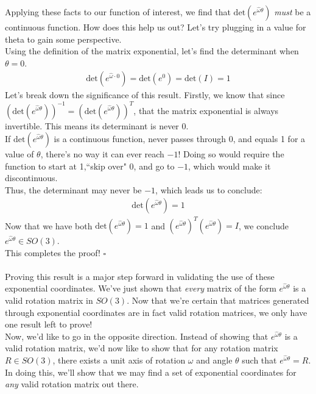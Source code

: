 \documentclass[oneside]{book}
\begin{document}
Applying these facts to our function of interest, we find that $\mathrm{det}(e^{\hat\omega\theta})$ \textit{must} be a continuous function. How does this help us out? Let's try plugging in a value for theta to gain some perspective.\\
Using the definition of the matrix exponential, let's find the determinant when $\theta = 0$.
\begin{align}
    \mathrm{det}(e^{\hat\omega\cdot 0}) = \mathrm{det}(e^{0}) = \mathrm{det}(I) = 1
\end{align}
Let's break down the significance of this result. Firstly, we know that since $(\mathrm{det}(e^{\hat\omega\theta}))^{-1} = (\mathrm{det}(e^{\hat\omega\theta}))^T$, that the matrix exponential is always invertible. This means its determinant is never 0.\\
If $\mathrm{det}(e^{\hat\omega\theta})$ is a continuous function, never passes through 0, and equals 1 for a value of $\theta$, there's no way it can ever reach $-1$! Doing so would require the function to start at 1,``skip over" $0$, and go to $-1$, which would make it discontinuous.\\
Thus, the determinant may never be $-1$, which leads us to conclude:
\begin{align}
    \mathrm{det}(e^{\hat\omega\theta}) = 1
\end{align}
Now that we have both $\mathrm{det}(e^{\hat\omega\theta}) = 1$ and $(e^{\hat\omega\theta})^T(e^{\hat\omega\theta}) = I$, we conclude $e^{\hat\omega\theta} \in SO(3)$.\\
This completes the proof! $\square$\\\\
Proving this result is a major step forward in validating the use of these exponential coordinates. We've just shown that \textit{every} matrix of the form $e^{\hat\omega\theta}$ is a valid rotation matrix in $SO(3)$. Now that we're certain that matrices generated through exponential coordinates are in fact valid rotation matrices, we only have one result left to prove!\\
Now, we'd like to go in the opposite direction. Instead of showing that $e^{\hat\omega\theta}$ is a valid rotation matrix, we'd now like to show that for any rotation matrix $R\in SO(3)$, there exists a unit axis of rotation $\omega$ and angle $\theta$ such that $e^{\hat\omega\theta} = R$. In doing this, we'll show that we may find a set of exponential coordinates for \textit{any} valid rotation matrix out there.\\
\end{document}
